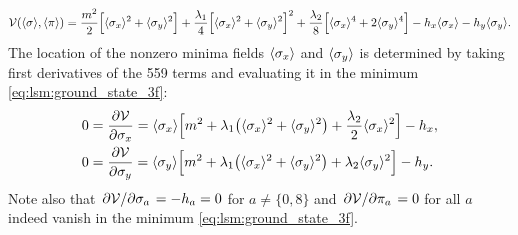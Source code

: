 \begin{equation}
	\mathcal{V}(\langle \sigma \rangle,\langle \pi \rangle) = \frac{m^2}{2} \Big[ \langle \sigma_x \rangle^2 + \langle \sigma_y \rangle^2 \Big] + \frac{\lambda_1}{4} \Big[ \langle \sigma_x \rangle^2 + \langle \sigma_y \rangle^2 \Big]^2 + \frac{\lambda_2}{8} \Big[ \langle \sigma_x \rangle^4 + 2 \langle \sigma_y \rangle^4 \Big] - h_x \langle \sigma_x \rangle - h_y \langle \sigma_y \rangle.
\label{eq:lsm:potential_tree_3f}
\end{equation}
The location of the nonzero minima fields $\langle \sigma_x \rangle$ and $\langle \sigma_y \rangle$ is determined
by taking first derivatives of the 559 terms and evaluating it in the minimum \eqref{eq:lsm:ground_state_3f}:
\begin{subequations}
\begin{align}
	0 &= \pdv{\mathcal{V}}{\sigma_x} = \langle \sigma_x \rangle \Big[ m^2 + \lambda_1 \big( \langle \sigma_x \rangle^2 + \langle \sigma_y \rangle^2 \big) + \frac{\lambda_2}{2} \langle \sigma_x \rangle^2 \Big] - h_x, \\
	0 &= \pdv{\mathcal{V}}{\sigma_y} = \langle \sigma_y \rangle \Big[ m^2 + \lambda_1 \big( \langle \sigma_x \rangle^2 + \langle \sigma_y \rangle^2 \big) + \lambda_2 \langle \sigma_y \rangle^2 \Big] - h_y.
\end{align}
\label{eq:lsm3f:symmetry_breakers}%
\end{subequations}
Note also that $\pdv{\mathcal{V}}/{\sigma_a} = -h_a = 0$ for $a \neq \{0,8\}$ and $\pdv{\mathcal{V}}/{\pi_a}=0$ for all $a$ indeed vanish in the minimum \eqref{eq:lsm:ground_state_3f}.

